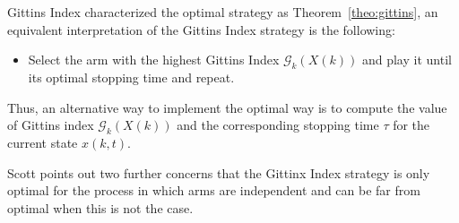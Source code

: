 Gittins Index characterized the optimal strategy as Theorem~\ref{theo:gittins}, an equivalent interpretation of the Gittins Index strategy is the following:
\begin{itemize}
\item	Select the arm with the highest Gittins Index $\mathscr{G}_k(X(k))$ and play it until its optimal stopping time and repeat.
\end{itemize}
Thus, an alternative way to implement the optimal way is to compute the value of Gittins index $\mathscr{G}_k(X(k))$ and the corresponding stopping time $\tau$ for the current state $x(k,t)$. 

Scott \cite{scott2010modern} points out two further concerns that the Gittinx Index strategy  is only optimal for the process in which arms are independent and can be far from optimal when this is not the case. 
